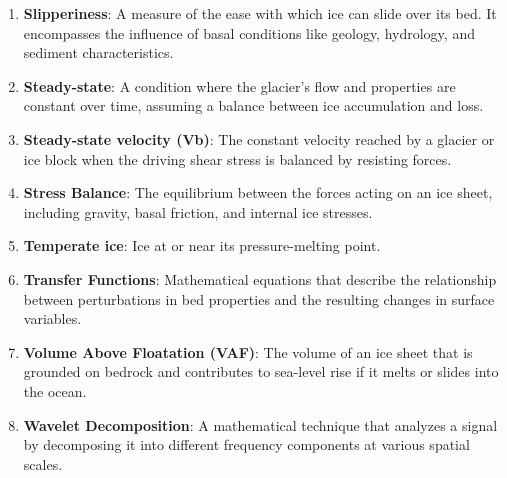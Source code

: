 \begin{enumerate}
\item \textbf{Slipperiness}: A measure of the ease with which ice can slide over its bed. It encompasses the influence of basal conditions like geology, hydrology, and sediment characteristics.
\item \textbf{Steady-state}: A condition where the glacier's flow and properties are constant over time, assuming a balance between ice accumulation and loss.
\item \textbf{Steady-state velocity (Vb)}: The constant velocity reached by a glacier or ice block when the driving shear stress is balanced by resisting forces.
\item \textbf{Stress Balance}: The equilibrium between the forces acting on an ice sheet, including gravity, basal friction, and internal ice stresses.
\item \textbf{Temperate ice}: Ice at or near its pressure-melting point.
\item \textbf{Transfer Functions}: Mathematical equations that describe the relationship between perturbations in bed properties and the resulting changes in surface variables.
\item \textbf{Volume Above Floatation (VAF)}: The volume of an ice sheet that is grounded on bedrock and contributes to sea-level rise if it melts or slides into the ocean.
\item \textbf{Wavelet Decomposition}: A mathematical technique that analyzes a signal by decomposing it into different frequency components at various spatial scales.
\end{enumerate}